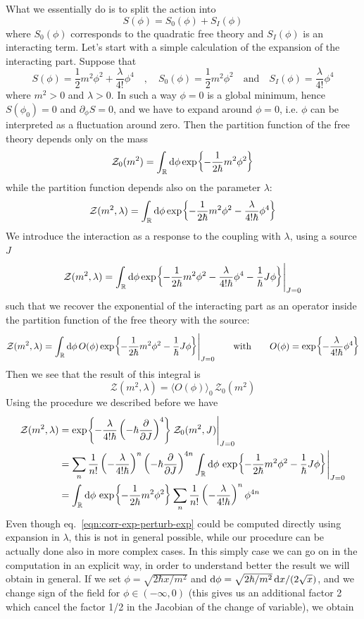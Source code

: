 \documentclass[../main/main.tex]{subfiles}
\begin{document}
What we essentially do is to split the action into 
\[S(\phi)=S_0(\phi)+S_I(\phi)\]
where $S_0(\phi)$ corresponds to the quadratic free theory and $S_I(\phi)$ is an interacting term. Let's start with a simple calculation of the expansion of the interacting part. Suppose that
\begin{equation}\label{eqn:action-examp-0d-perturb}
S(\phi)=\frac12m^2\phi^2+\frac\lambda{4!}\phi^4\quad,\quad S_0(\phi)=\frac12m^2\phi^2\quad\text{and}\quad S_I(\phi)=\frac\lambda{4!}\phi^4
\end{equation}
where $m^2>0$ and $\lambda>0$. In such a way $\phi=0$ is a global minimum, hence $S(\phi_0)=0$ and $\partial_\phi S=0$, and we have to expand around $\phi=0$, i.e. $\phi$ can be interpreted as a fluctuation around zero. Then the partition function of the free theory depends only on the mass
\[\mathcal Z_0(m^2)=\int_{\mathbb{R}}\textup{d}\phi \exp{-\frac1{2\hbar}m^2\phi^2}\]
while the partition function depends also on the parameter $\lambda$:
\[\mathcal Z(m^2,\lambda)=\int_{\mathbb{R}}\textup{d}\phi \exp{-\frac1{2\hbar}m^2\phi^2-\frac\lambda{4!\hbar}\phi^4}\]
We introduce the interaction as a response to the coupling with $\lambda$, using a source $J$
\begin{equation}\label{eqn:corr-exp-perturb-exp}
\mathcal Z(m^2,\lambda)=\int_{\mathbb{R}}\textup{d}\phi \exp{-\frac1{2\hbar}m^2\phi^2-\frac\lambda{4!\hbar}\phi^4-\frac1\hbar J\phi}\Bigg\vert_{J=0}
\end{equation}
such that we recover the exponential of the interacting part as an operator inside the partition function of the free theory with the source:
\[\mathcal Z(m^2,\lambda)=\int_{\mathbb{R}}\textup{d}\phi \,O(\phi)\exp{-\frac1{2\hbar}m^2\phi^2-\frac1\hbar J\phi}\Bigg\vert_{J=0}
\qquad\text{with}\qquad O(\phi)=\exp{-\frac\lambda{4!\hbar}\phi^4}\]
Then we see that the result of this integral is
\[\mathcal Z(m^2,\lambda)=\langle O(\phi)\rangle_0\,\mathcal Z_0(m^2)\]
Using the procedure we described before we have
\begin{align*}
\mathcal Z(m^2,\lambda)
&=\exp{-\frac\lambda{4!\hbar}\left(-\hbar\frac\partial{\partial J}\right)^4}\,\mathcal Z_0(m^2,J)\Bigg\vert_{J=0}\\
&=\sum_n\frac1{n!}\left(-\frac\lambda{4!\hbar}\right)^n\left(-\hbar\frac\partial{\partial J}\right)^{4n}\int_{\mathbb{R}}\textup{d}\phi \,\exp{-\frac1{2\hbar}m^2\phi^2-\frac1\hbar J\phi}\Bigg\vert_{J=0}\\
&=\int_{\mathbb{R}}\textup{d}\phi \,\exp{-\frac1{2\hbar}m^2\phi^2}\sum_n\frac1{n!}\left(-\frac\lambda{4!\hbar}\right)^n\phi^{4n}
\end{align*}
Even though eq.~\eqref{eqn:corr-exp-perturb-exp} could be computed directly using expansion in $\lambda$, this is not in general possible, while our procedure can be actually done also in more complex cases. In this simply case we can go on in the computation in an explicit way, in order to understand better the result we will obtain in general. If we set $\phi=\sqrt{2\hbar x/m^2}$ and $\textup{d}\phi=\sqrt{2\hbar/m^2}\,\textup{d} x/(2\sqrt x)$, and we change sign of the field for $\phi\in(-\infty,0)$ (this gives us an additional factor 2 which cancel the factor 1/2 in the Jacobian of the change of variable), we obtain
\end{document}
